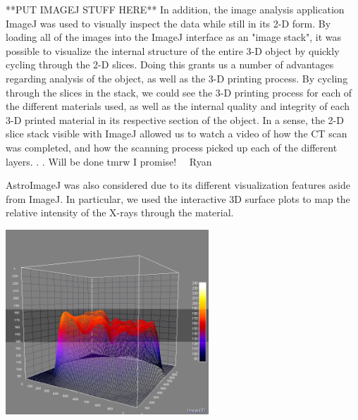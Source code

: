 \documentclass[11pt, letterpaper, notitlepage]{article}
\newenvironment{Figure}
  {\par\medskip\noindent\minipage{\linewidth}}
  {\endminipage\par\medskip}
\begin{document}
\begin{multicols}{2}
**PUT IMAGEJ STUFF HERE**
In addition, the image analysis application ImageJ was used to visually inspect the data while still in its 2-D form.  By loading all of the images into the ImageJ interface as an "image stack", it was possible to visualize the internal structure of the entire 3-D object by quickly cycling through the 2-D slices. Doing this grants us a number of advantages regarding analysis of the object, as well as the 3-D printing process.  By cycling through the slices in the stack, we could see the 3-D printing process for each of the different materials used, as well as the internal quality and integrity of each 3-D printed material in its respective section of the object.  In a sense, the 2-D slice stack visible with ImageJ allowed us to watch a video of how the CT scan was completed, and how the scanning process picked up each of the different layers. . . 
Will be done tmrw I promise! ~~Ryan


AstroImageJ was also considered due to its different visualization features aside from ImageJ. In particular, we used the interactive 3D surface plots to map the relative intensity of the X-rays through the material.

\begin{Figure}
  \centering
  \includegraphics[width=3in]{images/Norm_Slice_Line_Plot_Angled.png}
  \label{fig:aij3dline}
\end{Figure}


\end{multicols}
\end{document}
